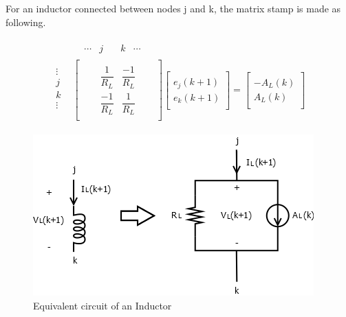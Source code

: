 For an inductor connected between nodes j and k, the matrix stamp is made as following.

\begin{align}
\begin{split}
&
\begin{matrix}
& \cdots & j & \quad k & \cdots
\end{matrix}\\[-6pt]
\begin{matrix}
\vdots\\[6pt]
j\\[6pt]
k\\[6pt]
\vdots\\
\end{matrix}
&
\begin{bmatrix}
	\quad & \quad &  \\[6pt]
	\quad & \dfrac{1}{R_L} & \dfrac{-1}{R_L} & \quad  \\[6pt]
	\quad & \dfrac{-1}{R_L} & \dfrac{1}{R_L} & \quad \\[6pt]
	\quad &  & 
\end{bmatrix}
\begin{bmatrix}
	\quad \\[6pt]
	e_j(k+1)\\[6pt]
	e_k(k+1)\\[6pt]
	\quad
\end{bmatrix}
=
\begin{bmatrix}
	\quad \\[6pt]
	-A_L(k)\\[6pt]
	A_L(k)\\[6pt]
	\quad
\end{bmatrix}
\end{split}
\end{align}

\begin{figure}[ht]
	\centering
	\includegraphics[scale=0.6]{img/Inductor.png} 
	\caption{Equivalent circuit of an Inductor}
	\label{fig:Inductor}
\end{figure}

